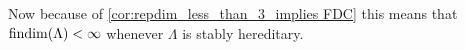 %		

Now because of \cref{cor:repdim_less_than_3_implies FDC} this means that $\operatorname{findim}(\Lambda) < \infty$ whenever $\Lambda$ is stably hereditary.